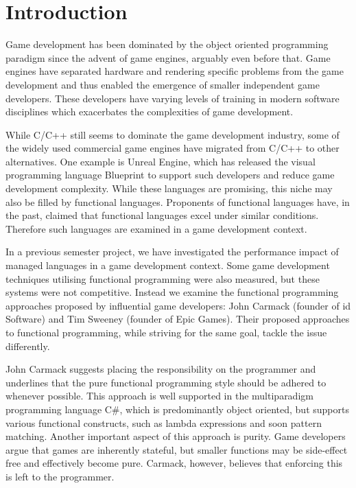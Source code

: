 \chapter{Introduction} \label{chap:introduction}
Game development has been dominated by the object oriented programming paradigm since the advent of game engines\cite{anderson2011:scripting-classes}, arguably even before that. Game engines have separated hardware and rendering specific problems from the game development and thus enabled the emergence of smaller independent game developers\cite{michael2003indie}. These developers have varying levels of training in modern software disciplines\cite{mcgill2009defining, hewner2010game} which exacerbates the complexities of game development\cite{blow2004game}.

While C/C++ still seems to dominate the game development industry\cite{wikipedia:list:of:game:engines}, some of the widely used commercial game engines have migrated from C/C++ to other alternatives. One example is Unreal Engine, which has released the visual programming language Blueprint\cite{unreal:blueprint:intro} to support such developers and reduce game development complexity\cite{unreal:blueprint:overview}. While these languages are promising, this niche may also be filled by functional languages. Proponents of functional languages have, in the past, claimed that functional languages excel under similar conditions\cite{kemerer2009impact, hughes1989functional, hu2015functional}. Therefore such languages are examined in a game development context.

In a previous semester project, we have investigated the performance impact of managed languages in a game development context\cite{p92018gameplay}. Some game development techniques utilising functional programming were also measured, but these systems were not competitive. Instead we examine the functional programming approaches proposed by influential game developers: John Carmack (founder of id Software) and Tim Sweeney (founder of Epic Games). Their proposed approaches to functional programming, while striving for the same goal, tackle the issue differently.


John Carmack suggests placing the responsibility on the programmer and underlines that the pure functional programming style should be adhered to whenever possible\cite{gamasutra:c++functional}. This approach is well supported in the multiparadigm programming language C\#, which is predominantly object oriented, but supports various functional constructs, such as lambda expressions\cite{csharp:lambda} and soon pattern matching\cite{csharp:pattern:matching}. Another important aspect of this approach is purity. Game developers argue that games are inherently stateful\cite{games:stateful,blow2004game}, but smaller functions may be side-effect free and effectively become pure. Carmack, however, believes that enforcing this is left to the programmer.

